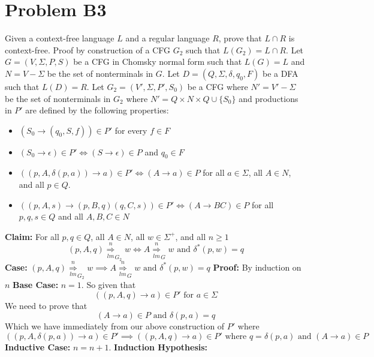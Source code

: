 \documentclass[12pt]{article}
\begin{document}
\section*{Problem B3}
Given a context-free language $L$ and a regular language $R$, prove that
$L\cap R$ is context-free. Proof by construction of a CFG $G_2$ such that
$L(G_2) = L\cap R$. Let $G = (V,\Sigma,P,S)$ be a CFG in Chomsky normal form
such that $L(G) = L$ and $N = V - \Sigma$ be the set of nonterminals in $G$.
Let $D = (Q,\Sigma, \delta, q_0, F)$ be a DFA such that $L(D) = R$.
Let $G_2 = (V',\Sigma,P',S_0)$ be a CFG where $N' = V' - \Sigma$ be the set of
nonterminals in $G_2$ where $N' = Q\times N\times Q \cup \{S_0\}$ and
productions in $P'$ are defined by the following properties:
\begin{itemize}
\item $(S_0 \rightarrow (q_0,S,f)) \in P'$ for every $f \in F$
\item $(S_0 \rightarrow \epsilon) \in P' \iff (S\rightarrow \epsilon) \in P$ and
$q_0 \in F$
\item $((p,A,\delta(p,a)) \rightarrow a) \in P' \iff (A \rightarrow a) \in P$
for all $a \in \Sigma$, all $A \in N$, and all $p \in Q$.
\item $((p,A,s) \rightarrow (p,B,q)(q,C,s)) \in P' \iff (A \rightarrow BC)\in P$
for all $p,q,s \in Q$ and all $A,B,C \in N$
\end{itemize}
\textbf{Claim: } For all $p,q\in Q$, all $A\in N$, all $w\in \Sigma^+$,
and all $n\ge 1$
$$(p,A,q) \underset{lm}{\overset{n}{\Longrightarrow}}_{G_2} w
\iff A \underset{lm}{\overset{n}{\Longrightarrow}}_{G} w
\text{ and } \delta^*(p,w) = q$$
\textbf{Case: } $(p,A,q) \underset{lm}{\overset{n}{\Longrightarrow}}_{G_2} w
\implies A \underset{lm}{\overset{n}{\Longrightarrow}}_{G} w
\text{ and } \delta^*(p,w) = q$
\newline \textbf{Proof: } By induction on $n$
\newline \textbf{Base Case: } $n = 1$.
\medskip \newline
So given that
$$((p,A,q) \rightarrow a) \in P' \text{ for } a\in \Sigma$$
We need to prove that
$$ (A \rightarrow a) \in P \text{ and } \delta(p,a) = q$$
Which we have immediately from our above construction of $P'$ where
$$((p,A,\delta(p,a)) \rightarrow a) \in P' \implies
((p,A,q) \rightarrow a) \in P' \text{ where } q=\delta(p,a) \text{ and }
(A\rightarrow a) \in P$$
\newline \textbf{Inductive Case: } $n = n+1$.
\newline \textbf{Induction Hypothesis: }
\end{document}
